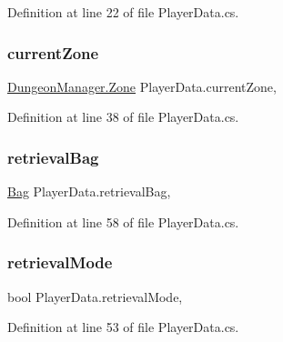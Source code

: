 Definition at line 22 of file Player\+Data.\+cs.

\mbox{\label{class_player_data_a8e1bd4482b28bb85156d2aef7be04809}} 
\subsubsection{\texorpdfstring{currentZone}{currentZone}}
{\footnotesize\ttfamily \mbox{\hyperlink{class_dungeon_manager_a6558d4a01889674bf25c798f1b90a431}{Dungeon\+Manager.\+Zone}} Player\+Data.\+current\+Zone\hspace{0.3cm}{\ttfamily [get]}, {\ttfamily [set]}}



Definition at line 38 of file Player\+Data.\+cs.

\mbox{\label{class_player_data_a7ce87c3307030f2a67f5628ca1c69c82}} 
\subsubsection{\texorpdfstring{retrievalBag}{retrievalBag}}
{\footnotesize\ttfamily \mbox{\hyperlink{class_bag}{Bag}} Player\+Data.\+retrieval\+Bag\hspace{0.3cm}{\ttfamily [get]}, {\ttfamily [set]}}



Definition at line 58 of file Player\+Data.\+cs.

\mbox{\label{class_player_data_ae258f6bda605a5d3c9d4d701af4bf4d4}} 
\subsubsection{\texorpdfstring{retrievalMode}{retrievalMode}}
{\footnotesize\ttfamily bool Player\+Data.\+retrieval\+Mode\hspace{0.3cm}{\ttfamily [get]}, {\ttfamily [set]}}



Definition at line 53 of file Player\+Data.\+cs.

